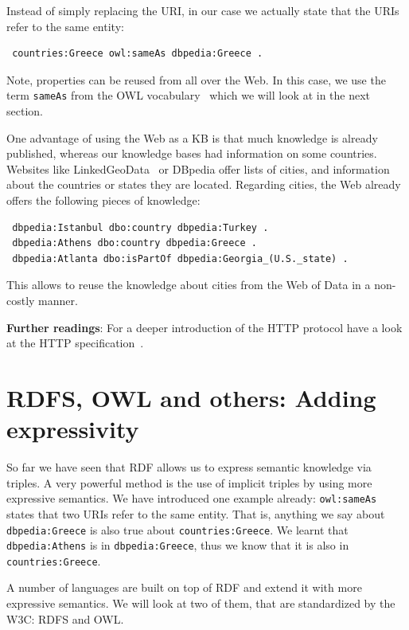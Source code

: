 Instead of simply replacing the URI, in our case we actually state that the URIs refer to the same entity:

\begin{verbatim}
 countries:Greece owl:sameAs dbpedia:Greece .
\end{verbatim}

Note, properties can be reused from all over the Web.
In this case, we use the term \texttt{sameAs} from the OWL vocabulary~\cite{owl} which we will look at in the next section.

One advantage of using the Web as a \ac{KB} is that much knowledge is already published,
whereas our knowledge bases had information on some countries.
Websites like LinkedGeoData~\cite{linkedgeodata} or DBpedia offer lists of cities, and information about the countries or states they are located.
Regarding cities, the Web already offers the following pieces of knowledge:

\begin{verbatim}
 dbpedia:Istanbul dbo:country dbpedia:Turkey .
 dbpedia:Athens dbo:country dbpedia:Greece .
 dbpedia:Atlanta dbo:isPartOf dbpedia:Georgia_(U.S._state) .
\end{verbatim}

This allows to reuse the knowledge about cities from the Web of Data in a non-costly manner.

\medskip

\textbf{Further readings}:
For a deeper introduction of the HTTP protocol have a look at the HTTP specification~\cite{http}.

\section{RDFS, OWL and others: Adding expressivity}
\label{rdfs}

So far we have seen that \ac{RDF} allows us to express semantic knowledge via triples.
A very powerful method is the use of implicit triples by using more expressive semantics.
We have introduced one example already: \texttt{owl:sameAs} states that two URIs refer to the same entity.
That is, anything we say about \texttt{dbpedia:Greece} is also true about \texttt{countries:Greece}.
We learnt that \texttt{dbpedia:Athens} is in \texttt{dbpedia:Greece}, thus we know that it is also in \texttt{countries:Greece}.

A number of languages are built on top of \ac{RDF} and extend it with more expressive semantics.
We will look at two of them, that are standardized by the W3C: RDFS and OWL. %

